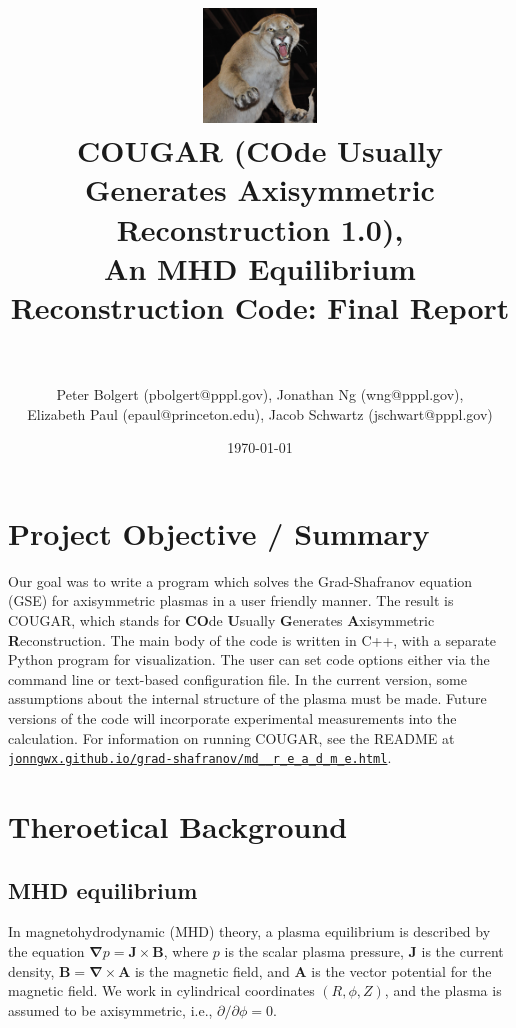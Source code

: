 \documentclass[paper=letter, fontsize=11pt]{scrartcl} %
\title{	
\includegraphics[width=3cm]{Cougar_Nevada}
\normalfont \normalsize 
\horrule{0.5pt} \\[0.4cm] %
\LARGE COUGAR (\textbf{CO}de \textbf{U}sually \textbf{G}enerates \textbf{A}xisymmetric \textbf{R}econstruction 1.0), \\ \Large An MHD Equilibrium Reconstruction Code: Final Report\\ %
\horrule{2pt} \\[0.5cm] %
}
\author{Peter Bolgert (pbolgert@pppl.gov), Jonathan Ng (wng@pppl.gov), \\ Elizabeth Paul (epaul@princeton.edu), Jacob Schwartz (jschwart@pppl.gov)} %
\date{\normalsize\today} %
\begin{document}
\maketitle %


\section{Project Objective / Summary}

Our goal was to write a program which solves the Grad-Shafranov equation (GSE) for axisymmetric plasmas in a user friendly manner.  The result is COUGAR, which stands for \textbf{CO}de \textbf{U}sually \textbf{G}enerates \textbf{A}xisymmetric \textbf{R}econstruction.  The main body of the code is written in C++, with a separate Python program for visualization.  The user can set code options either via the command line or text-based configuration file.  In the current version, some assumptions about the internal structure of the plasma must be made.  Future versions of the code will incorporate experimental measurements into the calculation.  For information on running COUGAR, see the README at \href{http://jonngwx.github.io/grad-shafranov/md__r_e_a_d_m_e.html}{\nolinkurl{jonngwx.github.io/grad-shafranov/md__r_e_a_d_m_e.html}}.


\section{Theroetical Background}

\subsection{MHD equilibrium}

In magnetohydrodynamic (MHD) theory, a plasma equilibrium is described by the equation $\mathbf{\nabla} p = \mathbf{J} \times \mathbf{B}$, where $p$ is the scalar plasma pressure, $\mathbf{J}$ is the current density, $\mathbf{B} = \mathbf{\nabla} \times \mathbf{A}$ is the magnetic field, and $\mathbf{A}$ is the vector potential for the magnetic field.  We work in cylindrical coordinates $(R, \phi, Z)$, and the plasma is assumed to be axisymmetric, i.e., $\partial / \partial \phi = 0$.
\end{document}
